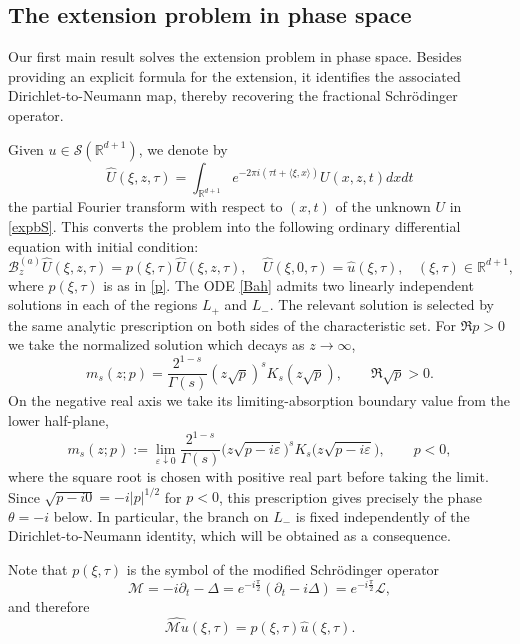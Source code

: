 \documentclass[11pt,letter]{amsart}
\def \R {\mathbb{R}}
\def \G{\Gamma}
\newcommand{\Ba}{\mathscr B_z^{(a)}}
\newcommand{\p}{\partial}
\numberwithin{equation}{section}
\newcommand{\sa}{\langle}
\newcommand{\da}{\rangle}
\newcommand{\M}{\mathcal M}
\newcommand{\Le}{\mathcal L}
\numberwithin{equation}{section}
\begin{document}
\subsection{The extension problem in phase space}\label{S:poiFT}

Our first main result solves the extension problem in phase space. Besides providing an explicit formula for the extension, it identifies the associated Dirichlet-to-Neumann map, thereby recovering the fractional Schr\"odinger operator.



Given $u\in \mathscr S(\R^{d+1})$, we denote by  
\[
\widehat U(\xi,z,\tau) = \int_{\R^{d+1}} e^{-2\pi i (\tau t + \sa\xi,x\da)} U(x,z,t) dx dt
\]
the partial Fourier transform with respect to $(x,t)$ of the unknown $U$ in \eqref{expbS}. This  converts the problem into the following ordinary differential equation with initial condition:
\begin{equation}\label{Bah}
\Ba \widehat U(\xi,z,\tau) = p(\xi,\tau) \widehat U(\xi,z,\tau),\ \ \ \ \ \widehat U(\xi,0,\tau) = \hat u(\xi,\tau),\ \ \ \  (\xi,\tau)\in \R^{d+1},
\end{equation}
where $p(\xi,\tau)$ is as in \eqref{p}. The ODE \eqref{Bah} admits two linearly independent
solutions in each of the regions $L_+$ and $L_-$. The relevant solution is selected
by the same analytic prescription on both sides of the characteristic set. For
$\Re p>0$ we take the normalized solution which decays as $z\to\infty$,
\[
m_s(z;p)=\frac{2^{1-s}}{\G(s)}(z\sqrt p)^sK_s(z\sqrt p),
\qquad \Re\sqrt p>0.
\]
On the negative real axis we take its limiting-absorption boundary value from the
lower half-plane,
\begin{equation}\label{E:limiting-absorption}
m_s(z;p):=\lim_{\varepsilon\downarrow0}
\frac{2^{1-s}}{\G(s)}
\bigl(z\sqrt{p-i\varepsilon}\bigr)^s
K_s\bigl(z\sqrt{p-i\varepsilon}\bigr),
\qquad p<0,
\end{equation}
where the square root is chosen with positive real part before taking the limit.
Since $\sqrt{p-i0}=-i|p|^{1/2}$ for $p<0$, this prescription gives precisely the
phase $\theta=-i$ below. In particular, the branch on $L_-$ is fixed independently
of the Dirichlet-to-Neumann identity, which will be obtained as a consequence.


Note that $p(\xi,\tau)$ is the symbol of the modified Schr\"odinger operator
\begin{equation}\label{M}
\M = - i \p_t - \Delta = e^{-i\frac{\pi}2} (\p_t - i \Delta) = e^{-i\frac{\pi}2} \Le,
\end{equation}
and therefore
\begin{equation}\label{spec}
\widehat{\M u}(\xi,\tau) = p(\xi,\tau) \hat u(\xi,\tau).
\end{equation}
\end{document}
